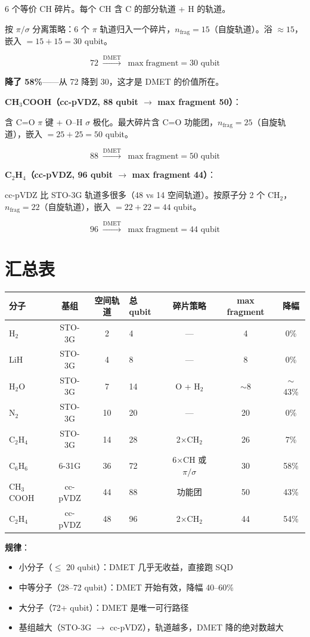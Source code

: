 \documentclass[11pt,a4paper]{article}
\begin{document}
6 个等价 CH 碎片。每个 CH 含 C 的部分轨道 + H 的轨道。

按 $\pi/\sigma$ 分离策略：6 个 $\pi$ 轨道归入一个碎片，$n_{\text{frag}} = 15$（自旋轨道）。浴 $\approx 15$，嵌入 $= 15 + 15 = 30$ qubit。

\begin{equation}
  72 \;\xrightarrow{\text{DMET}}\; \max\text{fragment} = 30 \text{ qubit}
\end{equation}

\textbf{降了 58\%}——从 72 降到 30，这才是 DMET 的价值所在。

\textbf{CH$_3$COOH（cc-pVDZ, 88 qubit $\to$ max fragment 50）}：

含 C=O $\pi$ 键 + O--H $\sigma$ 极化。最大碎片含 C=O 功能团，$n_{\text{frag}} = 25$（自旋轨道），嵌入 $= 25 + 25 = 50$ qubit。

\begin{equation}
  88 \;\xrightarrow{\text{DMET}}\; \max\text{fragment} = 50 \text{ qubit}
\end{equation}

\textbf{C$_2$H$_4$（cc-pVDZ, 96 qubit $\to$ max fragment 44）}：

cc-pVDZ 比 STO-3G 轨道多很多（48 vs 14 空间轨道）。按原子分 2 个 CH$_2$，$n_{\text{frag}} = 22$（自旋轨道），嵌入 $= 22 + 22 = 44$ qubit。

\begin{equation}
  96 \;\xrightarrow{\text{DMET}}\; \max\text{fragment} = 44 \text{ qubit}
\end{equation}

\section{汇总表}

\begin{center}
\begin{tabular}{lcclccc}
  \toprule
  分子 & 基组 & 空间轨道 & 总 qubit & 碎片策略 & max fragment & 降幅 \\
  \midrule
  H$_2$ & STO-3G & 2 & 4 & --- & 4 & 0\% \\
  LiH & STO-3G & 4 & 8 & --- & 8 & 0\% \\
  H$_2$O & STO-3G & 7 & 14 & O + H$_2$ & $\sim$8 & $\sim$43\% \\
  N$_2$ & STO-3G & 10 & 20 & --- & 20 & 0\% \\
  C$_2$H$_4$ & STO-3G & 14 & 28 & 2$\times$CH$_2$ & 26 & 7\% \\
  C$_6$H$_6$ & 6-31G & 36 & 72 & 6$\times$CH 或 $\pi/\sigma$ & 30 & 58\% \\
  CH$_3$COOH & cc-pVDZ & 44 & 88 & 功能团 & 50 & 43\% \\
  C$_2$H$_4$ & cc-pVDZ & 48 & 96 & 2$\times$CH$_2$ & 44 & 54\% \\
  \bottomrule
\end{tabular}
\end{center}

\textbf{规律}：
\begin{itemize}
  \item 小分子（$\leq$ 20 qubit）：DMET 几乎无收益，直接跑 SQD
  \item 中等分子（28--72 qubit）：DMET 开始有效，降幅 40--60\%
  \item 大分子（72+ qubit）：DMET 是唯一可行路径
  \item 基组越大（STO-3G $\to$ cc-pVDZ），轨道越多，DMET 降的绝对数越大
\end{itemize}
\end{document}
